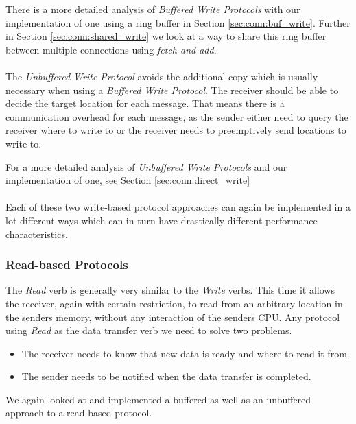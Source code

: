 There is a more detailed analysis of \emph{Buffered Write Protocols} with our implementation of one using a ring buffer in 
Section \ref{sec:conn:buf_write}. Further in Section \ref{sec:conn:shared_write} we look at a way to share this ring
buffer between multiple connections using \emph{fetch and add}.


\paragraph{} The  \emph{Unbuffered Write Protocol} avoids the additional copy which is usually necessary when 
using a \emph{Buffered Write Protocol}. The receiver should be able to decide the target location for each message. 
That means there is a communication overhead for each message, as the sender either need to query the receiver where to 
write to or the receiver needs to preemptively send locations to write to.

For a more detailed analysis of \emph{Unbuffered Write Protocols} and our implementation of one, 
see Section \ref{sec:conn:direct_write}


\paragraph{}Each of these two write-based protocol approaches can again be implemented in a lot different ways which can
in turn have drastically different performance characteristics. 


\subsubsection{Read-based Protocols}
The \emph{Read} verb is generally very similar to the \emph{Write} verbs. This time it allows the receiver, again with certain
restriction, to read from an arbitrary location in the senders memory, without any interaction of the senders CPU. Any protocol
using \emph{Read} as the data transfer verb we need to solve two problems.

\begin{itemize}
  \item The receiver needs to know that new data is ready and where to read it from.
  \item The sender needs to be notified when the data transfer is completed.
\end{itemize}

We again looked at and implemented a buffered as well as an unbuffered approach to a read-based protocol. 


